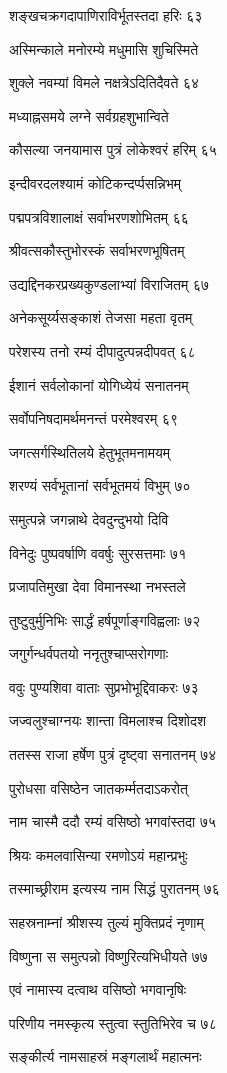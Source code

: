 शङ्खचक्रगदापाणिराविर्भूतस्तदा हरिः ६३

अस्मिन्काले मनोरम्ये मधुमासि शुचिस्मिते

शुक्ले नवम्यां विमले नक्षत्रेऽदितिदैवते ६४

मध्याह्नसमये लग्ने सर्वग्रहशुभान्विते

कौसल्या जनयामास पुत्रं लोकेश्वरं हरिम् ६५

इन्दीवरदलश्यामं कोटिकन्दर्प्पसन्निभम्

पद्मपत्रविशालाक्षं सर्वाभरणशोभितम् ६६

श्रीवत्सकौस्तुभोरस्कं सर्वाभरणभूषितम्

उद्यद्दिनकरप्रख्यकुण्डलाभ्यां विराजितम् ६७

अनेकसूर्य्यसङ्काशं तेजसा महता वृतम्

परेशस्य तनो रम्यं दीपादुत्पन्नदीपवत् ६८

ईशानं सर्वलोकानां योगिध्येयं सनातनम्

सर्वोपनिषदामर्थमनन्तं परमेश्वरम् ६९

जगत्सर्गस्थितिलये हेतुभूतमनामयम्

शरण्यं सर्वभूतानां सर्वभूतमयं विभुम् ७०

समुत्पन्ने जगन्नाथे देवदुन्दुभयो दिवि

विनेदुः पुष्पवर्षाणि ववर्षुः सुरसत्तमाः ७१

प्रजापतिमुखा देवा विमानस्था नभस्तले

तुष्टुवुर्मुनिभिः सार्द्धं हर्षपूर्णाङ्गविह्वलाः ७२

जगुर्गन्धर्वपतयो ननृतुश्चाप्सरोगणाः

ववुः पुण्यशिवा वाताः सुप्रभोभूद्दिवाकरः ७३

जज्वलुश्चाग्नयः शान्ता विमलाश्च दिशोदश

ततस्स राजा हर्षेण पुत्रं दृष्ट्वा सनातनम् ७४

पुरोधसा वसिष्ठेन जातकर्म्मतदाऽकरोत्

नाम चास्मै ददौ रम्यं वसिष्ठो भगवांस्तदा ७५

श्रियः कमलवासिन्या रमणोऽयं महान्प्रभुः

तस्माच्छ्रीराम इत्यस्य नाम सिद्धं पुरातनम् ७६

सहस्रनाम्नां श्रीशस्य तुल्यं मुक्तिप्रदं नृणाम्

विष्णुना स समुत्पन्नो विष्णुरित्यभिधीयते ७७

एवं नामास्य दत्वाथ वसिष्ठो भगवानृषिः

परिणीय नमस्कृत्य स्तुत्वा स्तुतिभिरेव च ७८

सङ्कीर्त्य नामसाहस्रं मङ्गलार्थं महात्मनः


